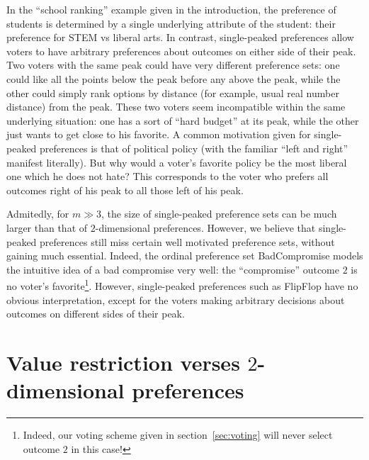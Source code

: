 \documentclass[12pt]{article}
\newcommand{\1}[1]{\mathds{1}[{#1}]}
\begin{document}
  In the ``school ranking'' example given in the introduction, the preference of
  students is determined by a single underlying attribute of the student:
  their preference for STEM vs liberal arts.
  In contrast, single-peaked preferences allow voters to have arbitrary
  preferences about outcomes on either side of their peak.
  Two voters with the same peak could have very different preference sets:
  one could like all the points below the peak before any above the peak,
  while the other could simply rank options by distance (for example,
  usual real number distance) from the peak.
  These two voters seem incompatible within the same underlying situation:
  one has a sort of ``hard budget'' at its peak, while the other just
  wants to get close to his favorite.
  A common motivation given for single-peaked preferences is that of political
  policy (with the familiar ``left and right'' manifest literally).
  But why would a voter's favorite policy be the most liberal one which he does
  not hate? This corresponds to the voter who prefers all outcomes right of his
  peak to all those left of his peak.

  Admitedly, for $m \gg 3$, the size of single-peaked preference sets can be
  much larger than that of $2$-dimensional preferences.
  However, we believe that single-peaked preferences still miss certain well
  motivated preference sets, without gaining much essential.
  Indeed, the ordinal preference set {\sc BadCompromise} models the intuitive
  idea of a bad compromise very well: the ``compromise'' outcome $2$ is
  no voter's favorite\footnote{
    Indeed, our voting scheme given in section~\ref{sec:voting} will never
    select outcome $2$ in this case!
  }. However, single-peaked preferences such as {\sc FlipFlop} have no obvious
  interpretation, except for the voters making arbitrary decisions about
  outcomes on different sides of their peak.

\section{Value restriction verses $2$-dimensional preferences}
  \label{sec:VRvsTwoD}
\end{document}
